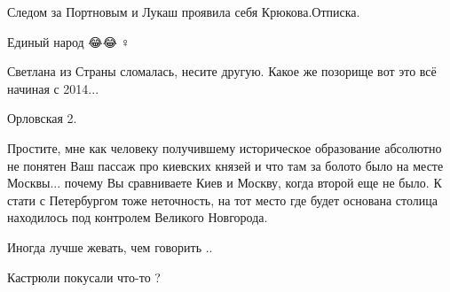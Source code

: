 \begin{itemize}
Следом за Портновым и Лукаш проявила себя Крюкова.Отписка.

 

Единый народ 😂😂🤦♀️

Светлана из Страны сломалась, несите другую. Какое же позорище вот это всё
начиная с 2014...

 
Орловская 2.

 

Простите, мне как человеку получившему историческое образование абсолютно не
понятен Ваш пассаж про киевских князей и что там за болото было на месте
Москвы... почему Вы сравниваете Киев и Москву, когда второй еще не было. К
стати с Петербургом тоже неточность, на тот место где будет основана столица
находилось под контролем Великого Новгорода.

 
Иногда лучше жевать, чем говорить ..

 
Кастрюли покусали что-то ?

\begin{itemize}
 

\end{itemize}
\end{itemize}
